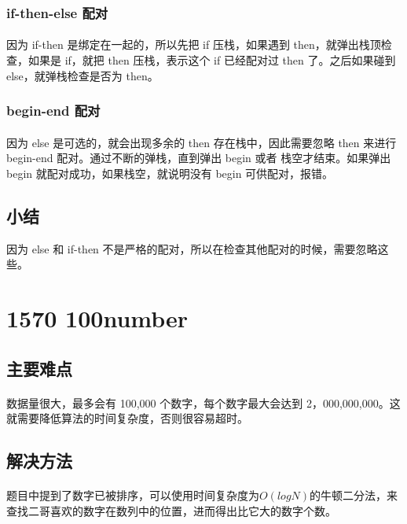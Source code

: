 \documentclass[UTF-8, 12pt]{ctexart}
\begin{document}
        \subsubsection{if-then-else 配对}
        \paragraph{}
    因为 if-then 是绑定在一起的，所以先把 if 压栈，如果遇到 then，就弹出栈顶检查，如果是 if，就把 then 压栈，表示这个 if 已经配对过 then 了。之后如果碰到 else，就弹栈检查是否为 then。
        \subsubsection{begin-end 配对}
        \paragraph{}
    因为 else 是可选的，就会出现多余的 then 存在栈中，因此需要忽略 then 来进行 begin-end 配对。通过不断的弹栈，直到弹出 begin 或者 栈空才结束。如果弹出 begin 就配对成功，如果栈空，就说明没有 begin 可供配对，报错。
    \subsection{小结}
    因为 else 和 if-then 不是严格的配对，所以在检查其他配对的时候，需要忽略这些。

\section{1570 100number}
    \subsection{主要难点}
    \paragraph{}
    数据量很大，最多会有 100,000 个数字，每个数字最大会达到 2，000,000,000。这就需要降低算法的时间复杂度，否则很容易超时。
    \subsection{解决方法}
    \paragraph{}
    题目中提到了数字已被排序，可以使用时间复杂度为$O(logN)$的牛顿二分法，来查找二哥喜欢的数字在数列中的位置，进而得出比它大的数字个数。
\end{document}
